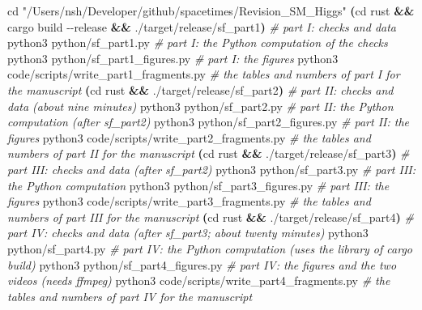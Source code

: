 \documentclass[
  10pt,
]{article}
\newenvironment{Shaded}{}{}
\newcommand{\AttributeTok}[1]{\textcolor[rgb]{0.49,0.56,0.16}{#1}}
\newcommand{\BuiltInTok}[1]{\textcolor[rgb]{0.00,0.50,0.00}{#1}}
\newcommand{\CommentTok}[1]{\textcolor[rgb]{0.38,0.63,0.69}{\textit{#1}}}
\newcommand{\ExtensionTok}[1]{#1}
\newcommand{\KeywordTok}[1]{\textcolor[rgb]{0.00,0.44,0.13}{\textbf{#1}}}
\newcommand{\NormalTok}[1]{#1}
\newcommand{\StringTok}[1]{\textcolor[rgb]{0.25,0.44,0.63}{#1}}
\begin{document}
\begin{Shaded}
\begin{Highlighting}[]
\BuiltInTok{cd} \StringTok{"/Users/nsh/Developer/github/spacetimes/Revision\_SM\_Higgs"}
\KeywordTok{(}\BuiltInTok{cd}\NormalTok{ rust }\KeywordTok{\&\&} \ExtensionTok{cargo}\NormalTok{ build }\AttributeTok{{-}{-}release} \KeywordTok{\&\&} \ExtensionTok{./target/release/sf\_part1}\KeywordTok{)}   \CommentTok{\# part I: checks and data}
\ExtensionTok{python3}\NormalTok{ python/sf\_part1.py                    }\CommentTok{\# part I: the Python computation of the checks}
\ExtensionTok{python3}\NormalTok{ python/sf\_part1\_figures.py            }\CommentTok{\# part I: the figures}
\ExtensionTok{python3}\NormalTok{ code/scripts/write\_part1\_fragments.py }\CommentTok{\# the tables and numbers of part I for the manuscript}
\KeywordTok{(}\BuiltInTok{cd}\NormalTok{ rust }\KeywordTok{\&\&} \ExtensionTok{./target/release/sf\_part2}\KeywordTok{)}        \CommentTok{\# part II: checks and data (about nine minutes)}
\ExtensionTok{python3}\NormalTok{ python/sf\_part2.py                    }\CommentTok{\# part II: the Python computation (after sf\_part2)}
\ExtensionTok{python3}\NormalTok{ python/sf\_part2\_figures.py            }\CommentTok{\# part II: the figures}
\ExtensionTok{python3}\NormalTok{ code/scripts/write\_part2\_fragments.py }\CommentTok{\# the tables and numbers of part II for the manuscript}
\KeywordTok{(}\BuiltInTok{cd}\NormalTok{ rust }\KeywordTok{\&\&} \ExtensionTok{./target/release/sf\_part3}\KeywordTok{)}        \CommentTok{\# part III: checks and data (after sf\_part2)}
\ExtensionTok{python3}\NormalTok{ python/sf\_part3.py                    }\CommentTok{\# part III: the Python computation}
\ExtensionTok{python3}\NormalTok{ python/sf\_part3\_figures.py            }\CommentTok{\# part III: the figures}
\ExtensionTok{python3}\NormalTok{ code/scripts/write\_part3\_fragments.py }\CommentTok{\# the tables and numbers of part III for the manuscript}
\KeywordTok{(}\BuiltInTok{cd}\NormalTok{ rust }\KeywordTok{\&\&} \ExtensionTok{./target/release/sf\_part4}\KeywordTok{)}        \CommentTok{\# part IV: checks and data (after sf\_part3; about twenty minutes)}
\ExtensionTok{python3}\NormalTok{ python/sf\_part4.py                    }\CommentTok{\# part IV: the Python computation (uses the library of cargo build)}
\ExtensionTok{python3}\NormalTok{ python/sf\_part4\_figures.py            }\CommentTok{\# part IV: the figures and the two videos (needs ffmpeg)}
\ExtensionTok{python3}\NormalTok{ code/scripts/write\_part4\_fragments.py }\CommentTok{\# the tables and numbers of part IV for the manuscript}

\end{Highlighting}
\end{Shaded}
\end{document}
